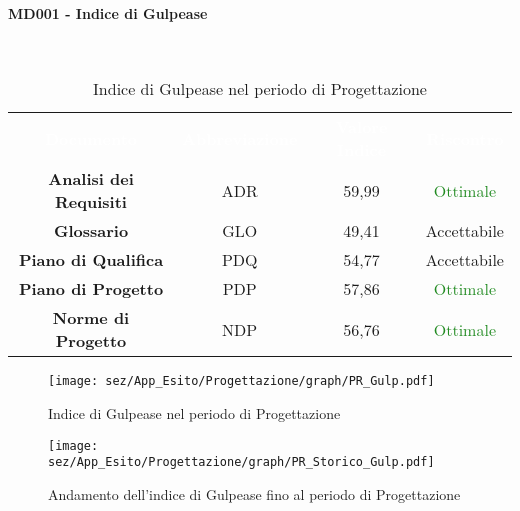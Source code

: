 \paragraph{MD001 - Indice di Gulpease}\mbox{}\\[0,3cm]
\begin{table}[H]
	\centering
	\begin{tabular}{cccc}
	\rowcolor{greySWEight}
	\textcolor{white}{\textbf{Documento}} & 
	\textcolor{white}{\textbf{Abbreviazione}} &
	\textcolor{white}{\textbf{Valore Indice}}&
	\textcolor{white}{\textbf{Riscontro}}\\
	
	\textbf{Analisi dei Requisiti} & ADR & 59,99 & \textcolor{ForestGreen}{Ottimale} \\
	\textbf{Glossario} & GLO & 49,41 & \textcolor{YellowOrange}{Accettabile} \\
	\textbf{Piano di Qualifica} & PDQ & 54,77 & \textcolor{YellowOrange}{Accettabile} \\
	\textbf{Piano di Progetto} & PDP & 57,86 & \textcolor{ForestGreen}{Ottimale} \\
	\textbf{Norme di Progetto} & NDP & 56,76 & \textcolor{ForestGreen}{Ottimale} \\

	\end{tabular}
	\caption{Indice di Gulpease nel periodo di Progettazione}
\end{table}
\begin{figure}[H]
	\texttt{[image: sez/App\_Esito/Progettazione/graph/PR\_Gulp.pdf]}
	\caption{Indice di Gulpease nel periodo di Progettazione}
\end{figure}

\begin{figure}[H]
	\texttt{[image: sez/App\_Esito/Progettazione/graph/PR\_Storico\_Gulp.pdf]}
	\caption{Andamento dell'indice di Gulpease fino al periodo di Progettazione}
\end{figure}
